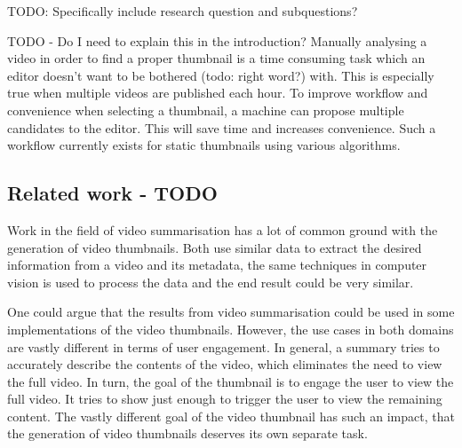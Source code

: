 \documentclass{../resources/acm_proc_article-sp}
\begin{document}
TODO: Specifically include research question and subquestions?

TODO - Do I need to explain this in the introduction?
Manually analysing a video in order to find a proper thumbnail is a time consuming task which an editor doesn't want to be bothered (todo: right word?) with. This is especially true when multiple videos are published each hour. To improve workflow and convenience when selecting a thumbnail, a machine can propose multiple candidates to the editor. This will save time and increases convenience. Such a workflow currently exists for static thumbnails using various algorithms.


\subsection{Related work - TODO}

Work in the field of video summarisation has a lot of common ground with the generation of video thumbnails. Both use similar data to extract the desired information from a video and its metadata, the same techniques in computer vision is used to process the data and the end result could be very similar. 

One could argue that the results from video summarisation could be used in some implementations of the video thumbnails. However, the use cases in both domains are vastly different in terms of user engagement. In general, a summary tries to accurately describe the contents of the video, which eliminates the need to view the full video. In turn, the goal of the thumbnail is to engage the user to view the full video. It tries to show just enough to trigger the user to view the remaining content. The vastly different goal of the video thumbnail has such an impact, that the generation of video thumbnails deserves its own separate task.
\end{document}
